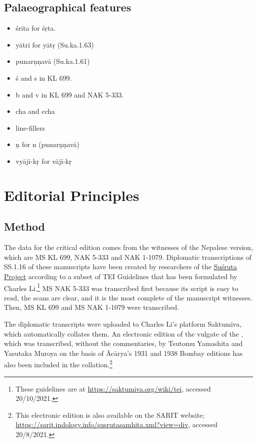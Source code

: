 \subsection{Palaeographical features}
\begin{itemize}
    \item śrita for śṛta.
    \item yātri for yātṛ (Su.ka.1.63) %
     \item punarṇṇavā  (Su.ka.1.61) %
    \item ś and s in KL 699.
    \item b and v in KL 699 and NAK 5-333.
    \item cha and ccha
    \item line-fillers
    \item \d n for n (punar\d n\d nav\=a)
    \item vyājī-kṛ for vājī-kṛ
\end{itemize}


\section{Editorial Principles}
\subsection{Method}
The data for the critical edition comes from the witnesses of the Nepalese version, 
which are MS KL 699, NAK 5-333 and NAK 1-1079. Diplomatic transcriptions of 
SS.1.16 of these manuscripts have been created by researchers of the 
\href{https://sushrutaproject.org}{Suśruta 
Project}\space%
according to a subset of TEI Guidelines that has been formulated by Charles 
Li.\footnote{These guidelines are at \url{https://saktumiva.org/wiki/tei}, accessed 
20/10/2021.} MS NAK 5-333 was transcribed first because its script is easy to 
read, the scans are clear, and it is the most complete of the manuscript 
witnesses. Then, MS KL 699 and MS NAK 1-1079 were transcribed. 

The diplomatic transcripts were uploaded to Charles Li's platform Saktumiva, which
automatically collates them. An electronic edition of the vulgate of the \SS,
which was transcribed, without the commentaries, by Tsutomu Yamashita and Yasutaka
Muroya on the basis of Ācārya's 1931 and 1938 Bombay editions has also been
included in the collation.\footnote{This electronic edition is also available on
    the SARIT website; \url{https://sarit.indology.info/susrutasamhita.xml?view=div},
    accessed 20/8/2021.}

